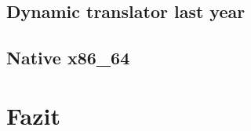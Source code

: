 \documentclass[course=eragp]{aspdoc}
\begin{document}
\subsection{Dynamic translator last year}
\subsection{Native x86\_64}

\section{Fazit}


{}
\end{document}
